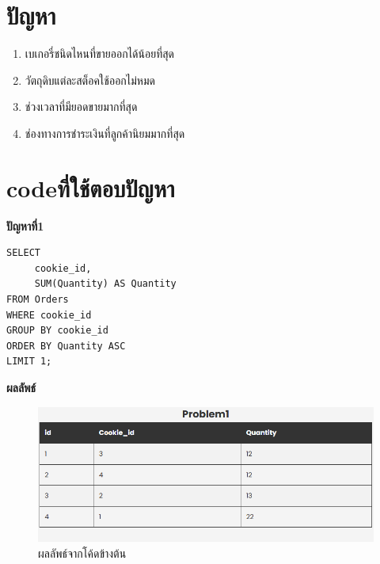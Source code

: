 \documentclass{report}
\begin{document}
\section{ปัญหา}
\begin{enumerate}
	\item เบเกอรี่ชนิดไหนที่ขายออกได้น้อยที่สุด
	\item วัตถุดิบแต่ละสต็อคใช้ออกไม่หมด
	\item ช่วงเวลาที่มียอดขายมากที่สุด
	\item ช่องทางการชำระเงินที่ลูกค้านิยมมากที่สุด
\end{enumerate}

\section{codeที่ใช้ตอบปัญหา}

\textbf{ปัญหาที่1} 
\begin{verbatim}
SELECT
	 cookie_id,
	 SUM(Quantity) AS Quantity
FROM Orders 
WHERE cookie_id
GROUP BY cookie_id
ORDER BY Quantity ASC
LIMIT 1;  
\end{verbatim}
\textbf{ผลลัพธ์}
\raggedright\begin{figure}[!ht]
    \centering
    \includegraphics[scale=0.85]{q1.png}
    \caption{ผลลัพธ์จากโค้ดข้างต้น} 
\label{fig:mesh1}
\end{figure} 
\end{document}
